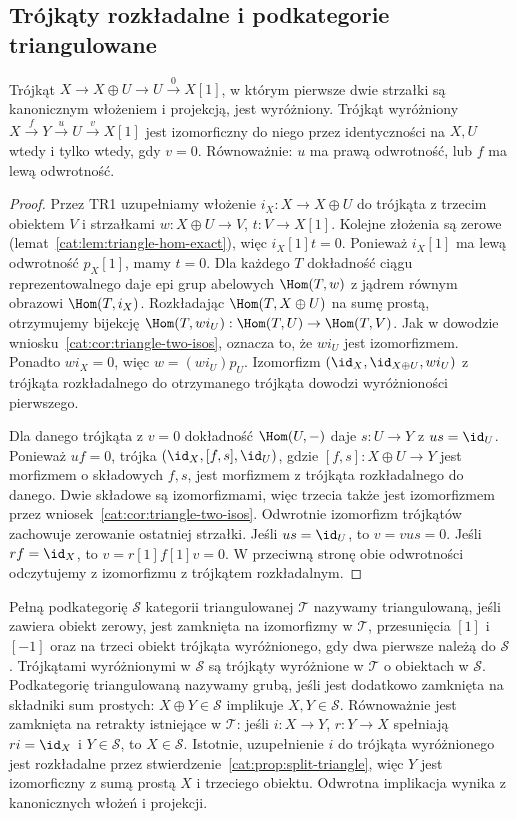 \subsection{Trójkąty rozkładalne i podkategorie triangulowane}
\begin{stwierdzenie}\label{cat:prop:split-triangle}
Trójkąt $X\to X\oplus U\to U\xrightarrow{0}X[1]$, w którym pierwsze dwie strzałki są kanonicznym włożeniem i projekcją, jest wyróżniony. Trójkąt wyróżniony $X\xrightarrow f Y\xrightarrow u U\xrightarrow v X[1]$ jest izomorficzny do niego przez identyczności na $X,U$ wtedy i tylko wtedy, gdy $v=0$. Równoważnie: $u$ ma prawą odwrotność, lub $f$ ma lewą odwrotność.
\end{stwierdzenie}
\begin{proof}
Przez TR1 uzupełniamy włożenie $i_X:X\to X\oplus U$ do trójkąta z trzecim obiektem $V$ i strzałkami $w:X\oplus U\to V$, $t:V\to X[1]$. Kolejne złożenia są zerowe (lemat~\ref{cat:lem:triangle-hom-exact}), więc $i_X[1]t=0$. Ponieważ $i_X[1]$ ma lewą odwrotność $p_X[1]$, mamy $t=0$. Dla każdego $T$ dokładność ciągu reprezentowalnego daje epi grup abelowych $\Hom(T,w)$ z jądrem równym obrazowi $\Hom(T,i_X)$. Rozkładając $\Hom(T,X\oplus U)$ na sumę prostą, otrzymujemy bijekcję $\Hom(T,w i_U):\Hom(T,U)\to\Hom(T,V)$. Jak w dowodzie wniosku~\ref{cat:cor:triangle-two-isos}, oznacza to, że $w i_U$ jest izomorfizmem. Ponadto $wi_X=0$, więc $w=(wi_U)p_U$. Izomorfizm $(\id_X,\id_{X\oplus U},wi_U)$ z trójkąta rozkładalnego do otrzymanego trójkąta dowodzi wyróżnioności pierwszego.

Dla danego trójkąta z $v=0$ dokładność $\Hom(U,-)$ daje $s:U\to Y$ z $us=\id_U$. Ponieważ $uf=0$, trójka $(\id_X,[f,s],\id_U)$, gdzie $[f,s]:X\oplus U\to Y$ jest morfizmem o składowych $f,s$, jest morfizmem z trójkąta rozkładalnego do danego. Dwie składowe są izomorfizmami, więc trzecia także jest izomorfizmem przez wniosek~\ref{cat:cor:triangle-two-isos}. Odwrotnie izomorfizm trójkątów zachowuje zerowanie ostatniej strzałki. Jeśli $us=\id_U$, to $v=vus=0$. Jeśli $rf=\id_X$, to $v=r[1]f[1]v=0$. W przeciwną stronę obie odwrotności odczytujemy z izomorfizmu z trójkątem rozkładalnym.
\end{proof}
\begin{definicja}\label{cat:def:thick-subcategory}
Pełną podkategorię $\mathcal S$ kategorii triangulowanej $\mathcal T$ nazywamy triangulowaną, jeśli zawiera obiekt zerowy, jest zamknięta na izomorfizmy w $\mathcal T$, przesunięcia $[1]$ i $[-1]$ oraz na trzeci obiekt trójkąta wyróżnionego, gdy dwa pierwsze należą do $\mathcal S$. Trójkątami wyróżnionymi w $\mathcal S$ są trójkąty wyróżnione w $\mathcal T$ o obiektach w $\mathcal S$. Podkategorię triangulowaną nazywamy grubą, jeśli jest dodatkowo zamknięta na składniki sum prostych: $X\oplus Y\in\mathcal S$ implikuje $X,Y\in\mathcal S$. Równoważnie jest zamknięta na retrakty istniejące w $\mathcal T$: jeśli $i:X\to Y$, $r:Y\to X$ spełniają $ri=\id_X$ i $Y\in\mathcal S$, to $X\in\mathcal S$. Istotnie, uzupełnienie $i$ do trójkąta wyróżnionego jest rozkładalne przez stwierdzenie~\ref{cat:prop:split-triangle}, więc $Y$ jest izomorficzny z sumą prostą $X$ i trzeciego obiektu. Odwrotna implikacja wynika z kanonicznych włożeń i projekcji.
\end{definicja}

